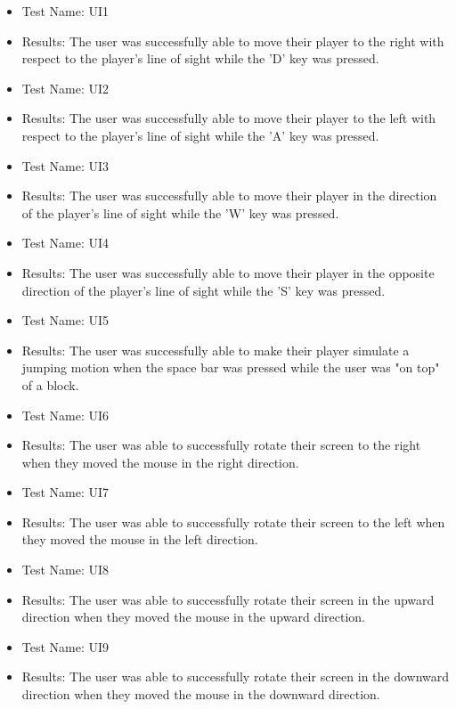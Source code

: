 \documentclass[12pt, titlepage]{article}
\begin{document}
\begin{itemize}
    \item[] Test Name: UI1
    \item[] Results: The user was successfully able to move their player to the right with respect to the player's line of sight while the 'D' key was pressed.\\
    \item[] Test Name: UI2
    \item[] Results: The user was successfully able to move their player to the left with respect to the player's line of sight while the 'A' key was pressed.\\
    \item[] Test Name: UI3
    \item[] Results: The user was successfully able to move their player in the direction of the player's line of sight while the 'W' key was pressed.\\
    \item[] Test Name: UI4
    \item[] Results: The user was successfully able to move their player in the opposite direction of the player's line of sight while the 'S' key was pressed.\\
    \item[] Test Name: UI5
    \item[] Results: The user was successfully able to make their player simulate a jumping motion when the space bar was pressed while the user was "on top" of a block.\\
    \item[] Test Name: UI6
    \item[] Results: The user was able to successfully rotate their screen to the right when they moved the mouse in the right direction.\\
    \item[] Test Name: UI7
    \item[] Results: The user was able to successfully rotate their screen to the left when they moved the mouse in the left direction.\\
    \item[] Test Name: UI8
    \item[] Results: The user was able to successfully rotate their screen in the upward direction when they moved the mouse in the upward direction.\\
    \item[] Test Name: UI9
    \item[] Results: The user was able to successfully rotate their screen in the downward direction when they moved the mouse in the downward direction.\\

\end{itemize}
\end{document}
